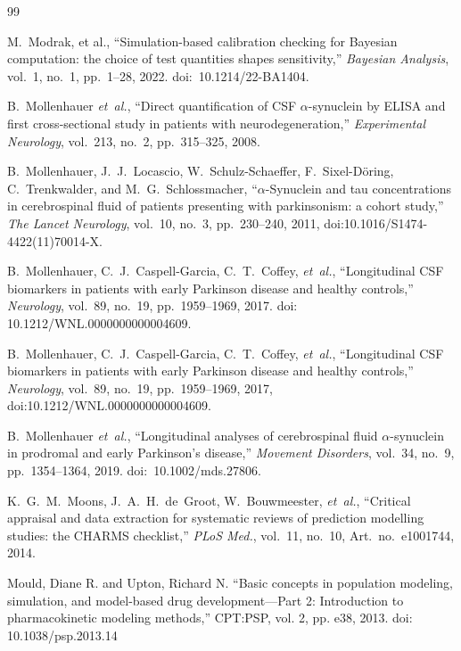 \begin{thebibliography}{99}

M.~Modrak, et al., ``Simulation-based calibration checking for Bayesian computation: the choice of test quantities shapes sensitivity,'' \textit{Bayesian Analysis}, vol.~1, no.~1, pp.~1--28, 2022. doi:~10.1214/22-BA1404.

B.~Mollenhauer \textit{et~al.}, ``Direct quantification of CSF $\alpha$-synuclein by ELISA and first cross-sectional study in patients with neurodegeneration,'' \textit{Experimental Neurology}, vol.~213, no.~2, pp.~315--325, 2008.

B.~Mollenhauer, J.~J.~Locascio, W.~Schulz-Schaeffer, F.~Sixel-D{\"o}ring, C.~Trenkwalder, and M.~G.~Schlossmacher, ``$\alpha$-Synuclein and tau concentrations in cerebrospinal fluid of patients presenting with parkinsonism: a cohort study,'' \textit{The Lancet Neurology}, vol.~10, no.~3, pp.~230--240, 2011, doi:10.1016/S1474-4422(11)70014-X.

B.~Mollenhauer, C.~J.~Caspell-Garcia, C.~T.~Coffey, \textit{et~al.}, ``Longitudinal CSF biomarkers in patients with early Parkinson disease and healthy controls,'' \textit{Neurology}, vol.~89, no.~19, pp.~1959--1969, 2017. doi:\,10.1212/WNL.0000000000004609.

B.~Mollenhauer, C.~J.~Caspell-Garcia, C.~T.~Coffey, \textit{et~al.}, ``Longitudinal CSF biomarkers in patients with early Parkinson disease and healthy controls,'' \textit{Neurology}, vol.~89, no.~19, pp.~1959--1969, 2017, doi:10.1212/WNL.0000000000004609.

B.~Mollenhauer \textit{et~al.}, ``Longitudinal analyses of cerebrospinal fluid $\alpha$-synuclein in prodromal and early Parkinson's disease,'' \textit{Movement Disorders}, vol.~34, no.~9, pp.~1354--1364, 2019. doi:~10.1002/mds.27806.

K.~G.~M.~Moons, J.~A.~H.~de~Groot, W.~Bouwmeester, \textit{et~al.}, ``Critical appraisal and data extraction for systematic reviews of prediction modelling studies: the CHARMS checklist,'' \textit{PLoS Med.}, vol.~11, no.~10, Art.\ no.~e1001744, 2014.


 Mould, Diane R. and Upton, Richard N. ``Basic concepts in population modeling, simulation, and model-based drug development---Part 2: Introduction to pharmacokinetic modeling methods,'' CPT:PSP, vol. 2, pp. e38, 2013. doi: 10.1038/psp.2013.14


\end{thebibliography}
